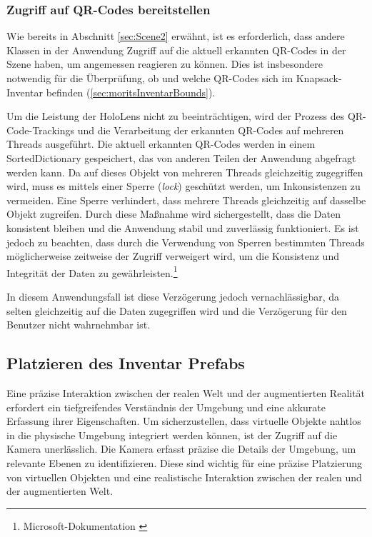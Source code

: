 \subsubsection{Zugriff auf QR-Codes bereitstellen}
Wie bereits in Abschnitt \ref{sec:Scene2} erwähnt, ist es erforderlich, dass andere Klassen in der Anwendung Zugriff auf die aktuell erkannten QR-Codes in der Szene haben, um angemessen reagieren zu können. Dies ist insbesondere notwendig für die Überprüfung, ob und welche QR-Codes sich im Knapsack-Inventar befinden (\ref{sec:moritsInventarBounds}).

Um die Leistung der HoloLens nicht zu beeinträchtigen, wird der Prozess des QR-Code-Trackings und die Verarbeitung der erkannten QR-Codes auf mehreren Threads ausgeführt. Die aktuell erkannten QR-Codes werden in einem SortedDictionary gespeichert, das von anderen Teilen der Anwendung abgefragt werden kann. Da auf dieses Objekt von mehreren Threads gleichzeitig zugegriffen wird, muss es mittels einer Sperre (\textit{lock}) geschützt werden, um Inkonsistenzen zu vermeiden. Eine Sperre verhindert, dass mehrere Threads gleichzeitig auf dasselbe Objekt zugreifen. Durch diese Maßnahme wird sichergestellt, dass die Daten konsistent bleiben und die Anwendung stabil und zuverlässig funktioniert. Es ist jedoch zu beachten, dass durch die Verwendung von Sperren bestimmten Threads möglicherweise zeitweise der Zugriff verweigert wird, um die Konsistenz und Integrität der Daten zu gewährleisten.\footnote{Microsoft-Dokumentation \cite{Lock-Statement}}

In diesem Anwendungsfall ist diese Verzögerung jedoch vernachlässigbar, da selten gleichzeitig auf die Daten zugegriffen wird und die Verzögerung für den Benutzer nicht wahrnehmbar ist.

\subsection{Platzieren des Inventar Prefabs}
Eine präzise Interaktion zwischen der realen Welt und der augmentierten Realität erfordert ein tiefgreifendes Verständnis
der Umgebung und eine akkurate Erfassung ihrer Eigenschaften. Um sicherzustellen, dass virtuelle Objekte nahtlos in die
physische Umgebung integriert werden können, ist der Zugriff auf die Kamera unerlässlich. Die Kamera erfasst präzise die
Details der Umgebung, um relevante Ebenen zu identifizieren. Diese sind wichtig für eine präzise Platzierung von virtuellen
Objekten und eine realistische Interaktion zwischen der realen und der augmentierten Welt.

